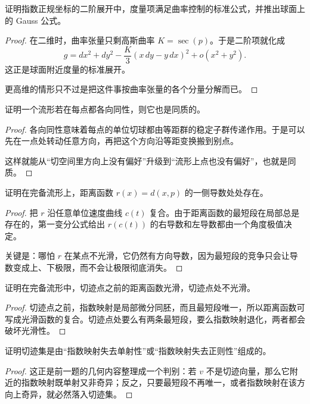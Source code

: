 \documentclass[11pt,a4paper,openany]{ctexbook}
\numberwithin{equation}{chapter}
\begin{document}
\begin{exercise}
证明指数正规坐标的二阶展开中，度量项满足曲率控制的标准公式，并推出球面上的 Gauss 公式。
\end{exercise}
\begin{proof}
在二维时，曲率张量只剩高斯曲率 \(K=\sec(p)\)。于是二阶项就化成
\[
g=dx^2+dy^2-\frac{K}{3}(x\,dy-y\,dx)^2+o(x^2+y^2).
\]
这正是球面附近度量的标准展开。

更高维的情形只不过是把这件事按曲率张量的各个分量分解而已。
\end{proof}

\begin{exercise}
证明一个流形若在每点都各向同性，则它也是同质的。
\end{exercise}
\begin{proof}
各向同性意味着每点的单位切球都由等距群的稳定子群传递作用。于是可以先在一点处转动任意方向，再把这个方向沿等距变换搬到别点。

这样就能从“切空间里方向上没有偏好”升级到“流形上点也没有偏好”，也就是同质。
\end{proof}

\begin{exercise}
证明在完备流形上，距离函数 \(r(x)=d(x,p)\) 的一侧导数处处存在。
\end{exercise}
\begin{proof}
把 \(r\) 沿任意单位速度曲线 \(c(t)\) 复合。由于距离函数的最短段在局部总是存在的，第一变分公式给出 \(r(c(t))\) 的右导数和左导数都由一个角度极值决定。

关键是：哪怕 \(r\) 在某点不光滑，它仍然有方向导数，因为最短段的竞争只会让导数变成上、下极限，而不会让极限彻底消失。
\end{proof}

\begin{exercise}
证明在完备流形中，切迹点之前的距离函数光滑，切迹点处不光滑。
\end{exercise}
\begin{proof}
切迹点之前，指数映射是局部微分同胚，而且最短段唯一，所以距离函数可写成光滑函数的复合。切迹点处要么有两条最短段，要么指数映射退化，两者都会破坏光滑性。
\end{proof}

\begin{exercise}
证明切迹集是由“指数映射失去单射性”或“指数映射失去正则性”组成的。
\end{exercise}
\begin{proof}
这正是前一题的几何内容整理成一个判别：若 \(v\) 不是切迹向量，那么它附近的指数映射既单射又非奇异；反之，只要最短段不再唯一，或者指数映射在该方向上奇异，就必然落入切迹集。
\end{proof}
\end{document}
